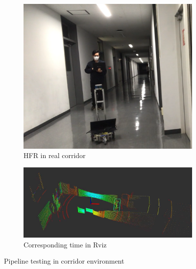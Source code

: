 \begin{figure}[!htb]
    \centering
    \begin{subfigure}{.5\linewidth}
        \centering
        \includegraphics[width=0.9\linewidth,height = 1.0\linewidth]{figures/chap4_fig/Results/Corridor/real_corridor.png}
          \caption{HFR in real corridor}
        \label{chap4:fig20:sub1}
    \end{subfigure}%
    \begin{subfigure}{.5\linewidth}
        \centering
        \includegraphics[width=1.0\linewidth,height = 1.0\linewidth]{figures/chap4_fig/Results/Corridor/rviz_corridor.png}
          \caption{Corresponding time in Rviz}
        \label{Chap4:fig20:sub2}
    \end{subfigure}
    \caption{Pipeline testing in corridor environment}
    \label{Chap4:fig20}
\end{figure}

